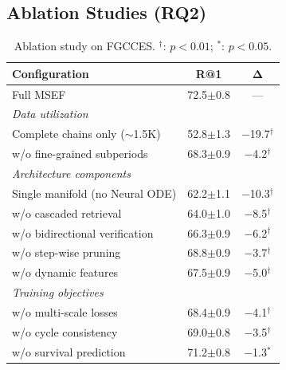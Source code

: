 \documentclass{article}
\begin{document}
\subsection{Ablation Studies (RQ2)}

\begin{table} %
\vspace{-1.2em} %
\centering
\small
\caption{Ablation study on FGCCES. $^\dagger$: $p < 0.01$; $^*$: $p < 0.05$.}
\label{tab:ablation}
\begin{tabular}{lcc}
\toprule
\textbf{Configuration} & \textbf{R@1} & $\boldsymbol{\Delta}$ \\
\midrule
Full MSEF & 72.5{\scriptsize$\pm$0.8} & --- \\
\midrule
\multicolumn{3}{l}{\textit{Data utilization}} \\
\quad Complete chains only ($\sim$1.5K) & 52.8{\scriptsize$\pm$1.3} & $-$19.7$^\dagger$ \\
\quad w/o fine-grained subperiods & 68.3{\scriptsize$\pm$0.9} & $-$4.2$^\dagger$ \\
\midrule
\multicolumn{3}{l}{\textit{Architecture components}} \\
\quad Single manifold (no Neural ODE) & 62.2{\scriptsize$\pm$1.1} & $-$10.3$^\dagger$ \\
\quad w/o cascaded retrieval & 64.0{\scriptsize$\pm$1.0} & $-$8.5$^\dagger$ \\
\quad w/o bidirectional verification & 66.3{\scriptsize$\pm$0.9} & $-$6.2$^\dagger$ \\
\quad w/o step-wise pruning & 68.8{\scriptsize$\pm$0.9} & $-$3.7$^\dagger$ \\
\quad w/o dynamic features & 67.5{\scriptsize$\pm$0.9} & $-$5.0$^\dagger$ \\
\midrule
\multicolumn{3}{l}{\textit{Training objectives}} \\
\quad w/o multi-scale losses & 68.4{\scriptsize$\pm$0.9} & $-$4.1$^\dagger$ \\
\quad w/o cycle consistency & 69.0{\scriptsize$\pm$0.8} & $-$3.5$^\dagger$ \\
\quad w/o survival prediction & 71.2{\scriptsize$\pm$0.8} & $-$1.3$^*$ \\
\bottomrule
\end{tabular}
\end{table}
\end{document}
